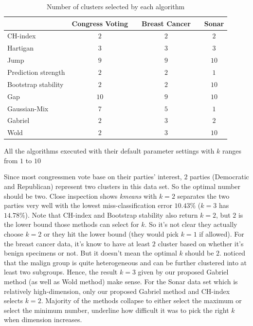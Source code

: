 \documentclass[11pt]{article}
\begin{document}
\begin{table}[H]
\begin{center}
\caption{\label{table2} Number of clusters selected by each algorithm}
\begin{tabular}{lccccc}
    \hline                  
 & Congress Voting && Breast Cancer && Sonar \\ \hline                    
CH-index & $2$ && $2$  && $2$    \\
Hartigan & $3$ && $3$  &&  $3$   \\
Jump & $9$ && $9$ && $10$  \\   
Prediction strength & $2$ &&  $2$ && $1$    \\
Bootstrap stability & $2$ &&  $2$ &&  $10$   \\ 
Gap & $10$ && $9$ && $10$  \\   
Gaussian-Mix & $7$ && $5$ && $1$  \\   
Gabriel & $2$  && $3$  && $2$  \\    
Wold & $2$ && $3$ && $10$ \\  \hline 
\end{tabular}
\end{center}
\hspace{0.5in} \footnotesize {All the algorithms executed with their default parameter settings with $k$ ranges from $1$ to $10$}
\end{table} 
\noindent
Since most congressmen vote base on their parties' interest, $2$ parties (Democratic and Republican) represent two clusters in this data set. So the optimal number should be two. Close inspection shows \textit{kmeans} with $k=2$ separates the two parties very well with the lowest miss-classification error $10.43\%$ ($k=3$ has $14.78\%$). Note that CH-index and Bootstrap stability also return $k=2$, but $2$ is the lower bound those methods can select for $k$. So it's not clear they actually choose $k=2$ or they hit the lower bound (they would pick $k=1$ if allowed). For the breast cancer data, it's know to have at least $2$ cluster based on whether it's benign specimens or not. But it doesn't mean the optimal $k$ should be $2$. \cite{fujita2014non} noticed that the malign group is quite heterogeneous and can be further clustered into at least two subgroups. Hence, the result $k=3$ given by our proposed Gabriel method (as well as Wold method) make sense. For the Sonar data set which is relatively high-dimension, only our proposed Gabriel method and CH-index selects $k=2$. Majority of the methods collapse to either select the maximum or select the minimum number, underline how difficult it was to pick the right $k$ when dimension increases. 
\end{document}
